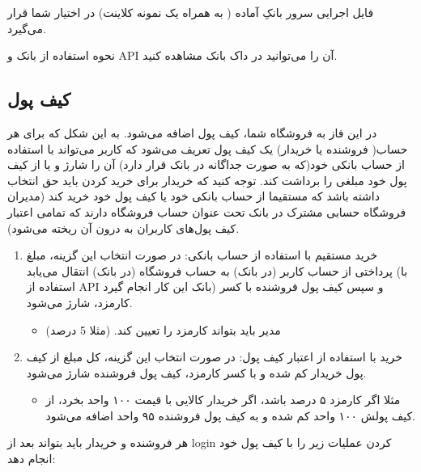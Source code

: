 \documentclass[]{article}
\begin{document}
فایل اجرایی سرور بانکِ آماده ( به همراه یک نمونه کلاینت) در اختیار شما قرار می‌گیرد.

نحوه استفاده از بانک و API آن را می‌توانید در \textcolor{CustomColor}{داک بانک} مشاهده کنید.

\newpage
\subsection*{{\titr کیف پول}}
در این فاز به \textcolor{CustomColor}{فروشگاه} شما، کیف پول اضافه می‌شود. به این شکل که برای هر حساب( فروشنده یا خریدار) یک کیف پول تعریف می‌شود که کاربر می‌تواند با استفاده از حساب بانکی خود(که به صورت جداگانه در بانک قرار دارد) آن را شارژ و یا از کیف پول خود مبلغی را برداشت کند. توجه کنید که خریدار برای خرید کردن باید حق انتخاب داشته باشد که مستقیما از حساب بانکی خود یا کیف پول خود خرید کند (مدیران فروشگاه حسابی مشترک در بانک تحت عنوان حساب فروشگاه دارند که تمامی اعتبار کیف پول‌های کاربران به درون آن ریخته می‌شود).


\begin{enumerate}

\item
خرید مستقیم با  استفاده از حساب بانکی: در صورت انتخاب این گزینه، مبلغ پرداختی از حساب کاربر (در بانک) به حساب فروشگاه (در بانک) انتقال می‌یابد (با استفاده از API بانک این کار انجام گیرد) و سپس کیف پول فروشنده با کسر کارمزد، شارژ‌ می‌شود.

\begin{itemize}[label=$\blacksquare$]
\item
مدیر باید بتواند کارمزد را تعیین کند. (مثلا 5 درصد)
\end{itemize}


\item
خرید با استفاده از اعتبار کیف پول:‌ در صورت انتخاب این گزینه، کل مبلغ از کیف پول خریدار کم شده و با کسر کارمزد، کیف پول فروشنده شارژ می‌شود.

\begin{itemize}[label=$\blacksquare$]
\item
مثلا اگر کارمزد ۵ درصد باشد، اگر خریدار کالایی با قیمت ۱۰۰ واحد بخرد، از کیف پولش ۱۰۰ واحد کم شده و به کیف پول فروشنده ۹۵ واحد اضافه می‌شود.
\end{itemize}

\end{enumerate}


هر فروشنده و خریدار باید بتواند بعد از login کردن عملیات زیر را با کیف پول خود انجام دهد:
\end{document}
